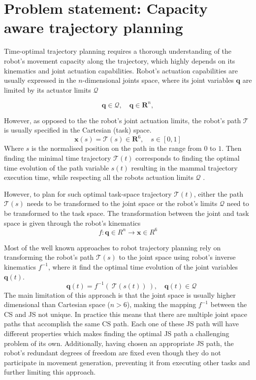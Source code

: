 \section{Problem statement: Capacity aware trajectory planning }\label{ch:problem_statement}

Time-optimal trajectory planning requires a thorough understanding of the robot's movement capacity along the trajectory, which highly depends on its kinematics and joint actuation capabilities. Robot's actuation capabilities are usually expressed in the $n$-dimensional joints space, where its joint variables $\bm{q}$ are limited by its actuator limits $\mathcal{Q}$

\begin{equation}
\bm{q} \in \mathcal{Q}, \quad \bm{q}\in \bm{R}^n,
\end{equation}

However, as opposed to the the robot's joint actuation limits, the robot's path $\mathcal{T}$ is usually specified in the Cartesian (task) space.
\begin{equation}
\bm{x}(s) = \mathcal{T}(s) \in \bm{R}^6,\quad s\in\left[0,1\right]
\end{equation}
Where $s$ is the normalised position on the path in the range from $0$ to $1$. Then finding the minimal time trajectory $\mathcal{T}(t)$ corresponds to finding the optimal time evolution of the path variable $s(t)$ resulting in the mammal trajectory execution time, while respecting all the robots actuation limits $\mathcal{Q}$ \cite{modernrobotics}. 

However, to plan for such optimal task-space trajectory $\mathcal{T}(t)$, either the path $\mathcal{T}(s)$ needs to be transformed to the joint space or the robot's limits $\mathcal{Q}$ need to be transformed to the task space.
The transformation between the joint and task space is given through the robot's kinematics
\begin{equation}
f : \bm{q} \in R^n \to \bm{x}\in  R^6
\end{equation}

Most of the well known approaches to robot trajectory planning rely on transforming the robot's path $\mathcal{T}(s)$ to the joint space using robot's inverse kinematics $f^{-1}$, where it find the optimal time evolution of the joint variables $\bm{q}(t)$.
\begin{equation}
 \quad \bm{q}(t) = f^{-1}\left(~\mathcal{T}\left(s\left(t\right)\right)~\right), \quad\bm{q}(t) \in \mathcal{Q} 
\end{equation}
The main limitation of this approach is that the joint space is usually higher dimensional than Cartesian space ($n>6$), making the mapping $f^{-1}$ between the CS and JS not unique. In practice this means that there are multiple joint space paths that accomplish the same CS path. Each one of these JS path will have different properties which makes finding the optimal JS path a challenging problem of its own. Additionally, having chosen an appropriate JS path, the robot's redundant degrees of freedom are fixed even though they do not participate in movement generation, preventing it from executing other tasks and further limiting this approach.


